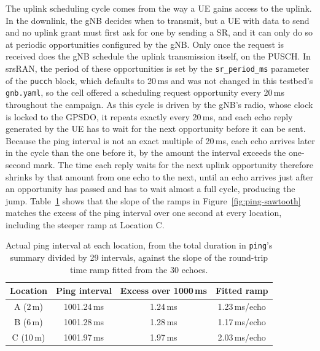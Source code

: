 The uplink scheduling cycle comes from the way a \gls{UE} gains access to the uplink. In the downlink, the \gls{gNB} decides when to transmit, but a \gls{UE} with data to send and no uplink grant must first ask for one by sending a \gls{SR}, and it can only do so at periodic opportunities configured by the \gls{gNB}. Only once the request is received does the \gls{gNB} schedule the uplink transmission itself, on the \gls{PUSCH}. In srsRAN, the period of these opportunities is set by the \texttt{sr\_period\_ms} parameter of the \texttt{pucch} block, which defaults to 20\,ms and was not changed in this testbed's \texttt{gnb.yaml}, so the cell offered a scheduling request opportunity every 20\,ms throughout the campaign. As this cycle is driven by the \gls{gNB}'s radio, whose clock is locked to the \gls{GPSDO}, it repeats exactly every 20\,ms, and each echo reply generated by the \gls{UE} has to wait for the next opportunity before it can be sent. Because the ping interval is not an exact multiple of 20\,ms, each echo arrives later in the cycle than the one before it, by the amount the interval exceeds the one-second mark. The time each reply waits for the next uplink opportunity therefore shrinks by that amount from one echo to the next, until an echo arrives just after an opportunity has passed and has to wait almost a full cycle, producing the jump. Table~\ref{tab:ping-drift} shows that the slope of the ramps in Figure~\ref{fig:ping-sawtooth} matches the excess of the ping interval over one second at every location, including the steeper ramp at Location C.

\begin{table}[htbp]
    \centering
    \begin{tabular}{|c|c|c|c|}
        \hline
        \textbf{Location} & \textbf{Ping interval} & \textbf{Excess over 1000\,ms} & \textbf{Fitted ramp} \\
        \hline
        A (2\,m) & 1001.24\,ms & 1.24\,ms & 1.23\,ms/echo \\
        \hline
        B (6\,m) & 1001.28\,ms & 1.28\,ms & 1.17\,ms/echo \\
        \hline
        C (10\,m) & 1001.97\,ms & 1.97\,ms & 2.03\,ms/echo \\
        \hline
    \end{tabular}
    \caption[Ping interval against the fitted round-trip time ramp.]{Actual ping interval at each location, from the total duration in \texttt{ping}'s summary divided by 29 intervals, against the slope of the round-trip time ramp fitted from the 30 echoes.}
    \label{tab:ping-drift}
\end{table}

